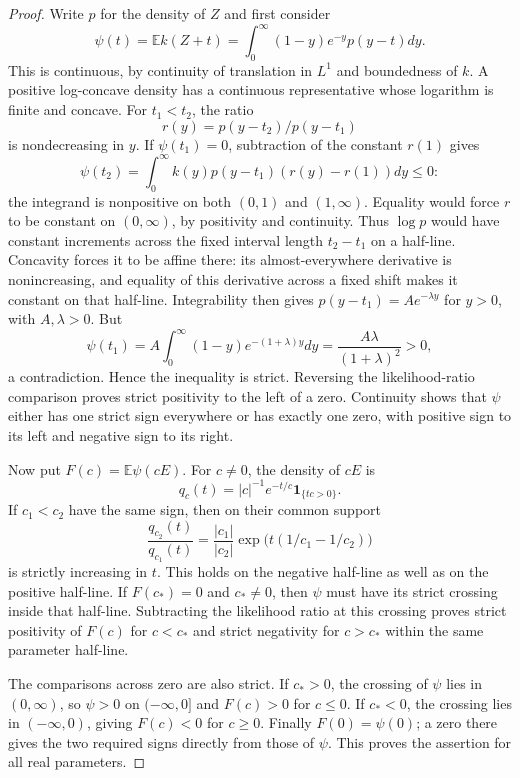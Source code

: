\begin{proof}
Write $p$ for the density of $Z$ and first consider
\[
 \psi(t)=\mathbb E k(Z+t)
        =\int_0^\infty(1-y)e^{-y}p(y-t)dy.
\]
This is continuous, by continuity of translation in $L^1$ and
boundedness of $k$. A positive log-concave density has a continuous
representative whose logarithm is finite and concave. For $t_1<t_2$,
the ratio
\[
 r(y)=p(y-t_2)/p(y-t_1)
\]
is nondecreasing in $y$. If $\psi(t_1)=0$, subtraction of the constant
$r(1)$ gives
\[
 \psi(t_2)
 =\int_0^\infty k(y)p(y-t_1)(r(y)-r(1))dy\le0:
\]
the integrand is nonpositive on both $(0,1)$ and $(1,\infty)$.
Equality would force $r$ to be constant on $(0,\infty)$, by positivity
and continuity. Thus $\log p$ would have constant increments across
the fixed interval length $t_2-t_1$ on a half-line. Concavity forces
it to be affine there: its almost-everywhere derivative is
nonincreasing, and equality of this derivative across a fixed shift
makes it constant on that half-line. Integrability then gives
$p(y-t_1)=A e^{-\lambda y}$ for $y>0$, with $A,\lambda>0$. But
\[
 \psi(t_1)=A\int_0^\infty(1-y)e^{-(1+\lambda)y}dy
         =\frac{A\lambda}{(1+\lambda)^2}>0,
\]
a contradiction. Hence the inequality is strict. Reversing the
likelihood-ratio comparison proves strict positivity to the left of a
zero. Continuity shows that $\psi$ either has one strict sign
everywhere or has exactly one zero, with positive sign to its left
and negative sign to its right.

Now put $F(c)=\mathbb E\psi(cE)$. For $c\ne0$, the density of $cE$ is
\[
 q_c(t)=|c|^{-1}e^{-t/c}\mathbf1_{\{tc>0\}}.
\]
If $c_1<c_2$ have the same sign, then on their common support
\[
 \frac{q_{c_2}(t)}{q_{c_1}(t)}
 =\frac{|c_1|}{|c_2|}
             \exp\bigl(t(1/c_1-1/c_2)\bigr)
\]
is strictly increasing in $t$. This holds on the negative half-line
as well as on the positive half-line. If $F(c_*)=0$ and $c_*\ne0$,
then $\psi$ must have its strict crossing inside that half-line.
Subtracting the likelihood ratio at this crossing proves strict
positivity of $F(c)$ for $c<c_*$ and strict negativity for $c>c_*$
within the same parameter half-line.

The comparisons across zero are also strict. If $c_*>0$, the crossing
of $\psi$ lies in $(0,\infty)$, so $\psi>0$ on $(-\infty,0]$ and
$F(c)>0$ for $c\le0$. If $c_*<0$, the crossing lies in
$(-\infty,0)$, giving $F(c)<0$ for $c\ge0$. Finally $F(0)=\psi(0)$;
a zero there gives the two required signs directly from those of
$\psi$. This proves the assertion for all real parameters.
\end{proof}

